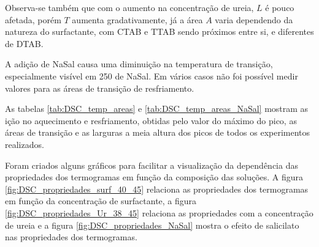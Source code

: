 	Observa-se também que com o aumento na concentração de ureia, $L$ é pouco afetada, porém $T$ aumenta gradativamente, já a área $A$ varia dependendo da natureza do surfactante, com CTAB e TTAB sendo próximos entre si, e diferentes de DTAB.
	
	A adição de NaSal causa uma diminuição na temperatura de transição, especialmente visível em 250\mM{} de NaSal. Em vários casos não foi possível medir valores para as áreas de transição de resfriamento.
	
	As tabelas \ref{tab:DSC_temp_areas} e \ref{tab:DSC_temp_areas_NaSal} mostram as ição no aquecimento e resfriamento, obtidas pelo valor do máximo do pico, as áreas de transição e as larguras a meia altura dos picos de todos os experimentos realizados.
	
	Foram criados alguns gráficos para facilitar a visualização da dependência das propriedades dos termogramas em função da composição das soluções. A figura \ref{fig:DSC_propriedades_surf_40_45} relaciona as propriedades dos termogramas em função da concentração de surfactante, a figura \ref{fig:DSC_propriedades_Ur_38_45} relaciona as propriedades com a concentração de ureia e a figura \ref{fig:DSC_propriedades_NaSal} mostra o efeito de salicilato nas propriedades dos termogramas.


